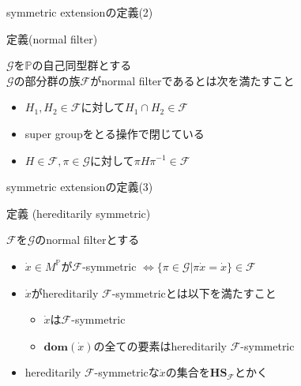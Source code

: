 \documentclass[17pt,aspectratio=169]{beamer}
\newcommand{\Pbb}{\mathbb{P}}
\newcommand{\Gcal}{\mathcal{G}}
\newcommand{\Fcal}{\mathcal{F}}
\begin{document}
\begin{frame}{symmetric extensionの定義(2)}
    \begin{itembox}[l]{定義(normal filter)}
        {\small
            $\Gcal$を$\Pbb$の自己同型群とする \\
            $\Gcal$の部分群の族$\Fcal$がnormal filterであるとは次を満たすこと
            \begin{itemize}
                \setlength{\itemsep}{3pt}
                \item $H_1, H_2 \in \Fcal$に対して$H_1 \cap H_2 \in \Fcal$
                \item super groupをとる操作で閉じている
                \item $H \in \Fcal, \pi \in \Gcal$に対して$\pi H \pi^{-1} \in \Fcal$
            \end{itemize} }
    \end{itembox}
\end{frame}

\begin{frame}{symmetric extensionの定義(3)}
    \begin{itembox}[l]{定義 (hereditarily symmetric)}
        {\small
            $\Fcal$を$\Gcal$のnormal filterとする
            \vspace{5pt}
            \begin{itemize}
                \setlength{\itemsep}{2pt}
                \vspace{-10pt}
                \item $\dot{x} \in M^\Pbb$が$\Fcal$-symmetric $\Leftrightarrow \{ \pi \in \Gcal | \pi \dot{x} = \dot{x} \} \in \Fcal$
                \item $\dot{x}$がhereditarily $\Fcal$-symmetricとは以下を満たすこと
                      \vspace{-3pt}
                      \begin{itemize}
                          \item $\dot{x}$は$\Fcal$-symmetric
                          \item $\bm{\mathbf{dom}}(\dot{x})$の全ての要素はhereditarily $\Fcal$-symmetric
                      \end{itemize}
                \item hereditarily $\Fcal$-symmetricな$\dot{x}$の集合を$\bm{\mathbf{HS}}_{\Fcal}$とかく

            \end{itemize}
        }
    \end{itembox}
\end{frame}
\end{document}
